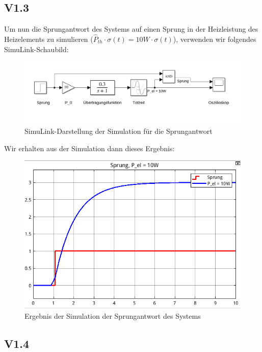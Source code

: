 \documentclass{report}
\begin{document}
\newpage

\subsection{V1.3}

Um nun die Sprungantwort des Systems auf einen Sprung in der Heizleistung des Heizelements zu simulieren ($\hat{P}_{th} \cdot \sigma(t) = 10W \cdot \sigma(t)$), verwenden wir folgendes SimuLink-Schaubild:

\begin{figure}[h]
  \centering
  \includegraphics[width=\textwidth]{../assets/images/RTP/rtp_1_V13.png}
  \caption{SimuLink-Darstellung der Simulation für die Sprungantwort}
  \label{fig:rtp1v13}
\end{figure}

Wir erhalten aus der Simulation dann dieses Ergebnis:

\begin{figure}[h]
  \centering
  \includegraphics[width=\textwidth]{../assets/images/RTP/rtp_1_V13_2.png}
  \caption{Ergebnis der Simulation der Sprungantwort des Systems}
  \label{fig:rtp1v13_2}
\end{figure}

\newpage

\subsection{V1.4}
\end{document}
